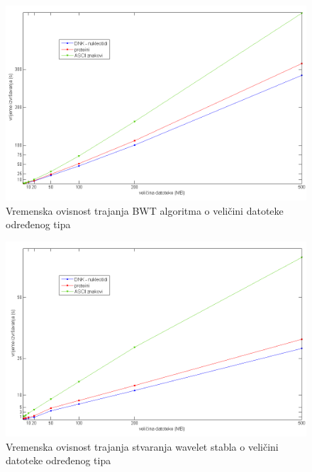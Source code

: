 \begin{figure}[H]
   \centering
       \includegraphics[width=\textwidth]{./pictures/test_bwt.png}
 \caption{Vremenska ovisnost trajanja BWT algoritma o veličini datoteke određenog tipa}
 \label{fig:test_bwt}
\end{figure}

\begin{figure}[H]
   \centering
       \includegraphics[width=\textwidth]{./pictures/test_wavelet.png}
 \caption{Vremenska ovisnost trajanja stvaranja wavelet stabla o veličini datoteke određenog tipa}
 \label{fig:test_wavelet}
\end{figure}

